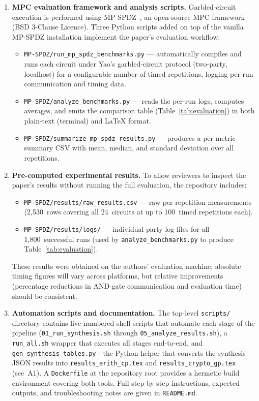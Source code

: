 \begin{enumerate}[leftmargin=*, label=\textbf{A\arabic*.}, itemsep=2pt]
\item \textbf{MPC evaluation framework and analysis scripts.}
  Garbled-circuit execution is performed using MP-SPDZ~\cite{keller2020mp},
  an open-source MPC framework (BSD 3-Clause Licence).
  Three Python scripts added on top of the vanilla MP-SPDZ installation
  implement the paper's evaluation workflow:
  \begin{itemize}[nosep]
    \item \texttt{MP-SPDZ/run\_mp\_spdz\_benchmarks.py} —
      automatically compiles and runs each circuit under
      Yao's garbled-circuit protocol (two-party, localhost) for a
      configurable number of timed repetitions, logging per-run
      communication and timing data.
    \item \texttt{MP-SPDZ/analyze\_benchmarks.py} —
      reads the per-run logs, computes averages, and emits the
      comparison table (Table~\ref{tab:evaluation}) in both
      plain-text (terminal) and \LaTeX{} format.
    \item \texttt{MP-SPDZ/summarize\_mp\_spdz\_results.py} —
      produces a per-metric summary CSV with mean, median, and
      standard deviation over all repetitions.
  \end{itemize}

\item \textbf{Pre-computed experimental results.}
  To allow reviewers to inspect the paper's results without running
  the full evaluation, the repository includes:
  \begin{itemize}[nosep]
    \item \texttt{MP-SPDZ/results/raw\_results.csv} —
      raw per-repetition measurements (2{,}530~rows covering all 24~circuits
      at up to 100~timed repetitions each).
    \item \texttt{MP-SPDZ/results/logs/} —
      individual party log files for all 1{,}800~successful runs
      (used by \texttt{analyze\_benchmarks.py} to produce
      Table~\ref{tab:evaluation}).
  \end{itemize}
  These results were obtained on the authors' evaluation machine; absolute
  timing figures will vary across platforms, but relative improvements
  (percentage reductions in AND-gate communication and evaluation time)
  should be consistent.

\item \textbf{Automation scripts and documentation.}
  The top-level \texttt{scripts/} directory contains five numbered shell
  scripts that automate each stage of the pipeline
  (\texttt{01\_run\_synthesis.sh} through \texttt{05\_analyze\_results.sh}),
  a \texttt{run\_all.sh} wrapper that executes all stages end-to-end, and
  \texttt{gen\_synthesis\_tables.py}—the Python helper that converts the
  synthesis JSON results into \texttt{results\_arith\_cp.tex} and
  \texttt{results\_crypto\_gp.tex} (see~A1).
  A \texttt{Dockerfile} at the repository root provides a hermetic build
  environment covering both tools.  Full step-by-step instructions,
  expected outputs, and troubleshooting notes are given in
  \texttt{README.md}.


\end{enumerate}

